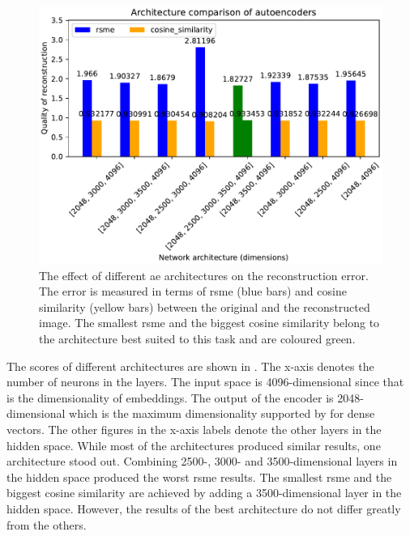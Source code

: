 \begin{figure}[!htb] %
    \centering
    \includegraphics[width=1\textwidth]{images/embeddings/autoencoder/ae_score_plot.pdf}
    \caption[Different \ac{ae} architectures and their reconstruction error]{The effect of different \ac{ae} architectures on the reconstruction error.
    The error is measured in terms of \ac{rsme} (blue bars) and cosine similarity (yellow bars) between the original and the reconstructed image.
    The smallest \ac{rsme} and the biggest cosine similarity belong to the architecture best suited to this task and are coloured green.
    }
    \label{fig:eval-ae-architecture}
\end{figure}

The scores of different architectures are shown in .
The x-axis denotes the number of neurons in the layers.
The input space is 4096-dimensional since that is the dimensionality of \infersent{} embeddings.
The output of the encoder is 2048-dimensional which is the maximum dimensionality supported by \databaseName{} for dense vectors.
The other figures in the x-axis labels denote the other layers in the hidden space.
While most of the architectures produced similar results, one architecture stood out.
Combining 2500-, 3000- and 3500-dimensional layers in the hidden space produced the worst \ac{rsme} results.
The smallest \ac{rsme} and the biggest cosine similarity are achieved by adding a 3500-dimensional layer in the hidden space.
However, the results of the best architecture do not differ greatly from the others.
